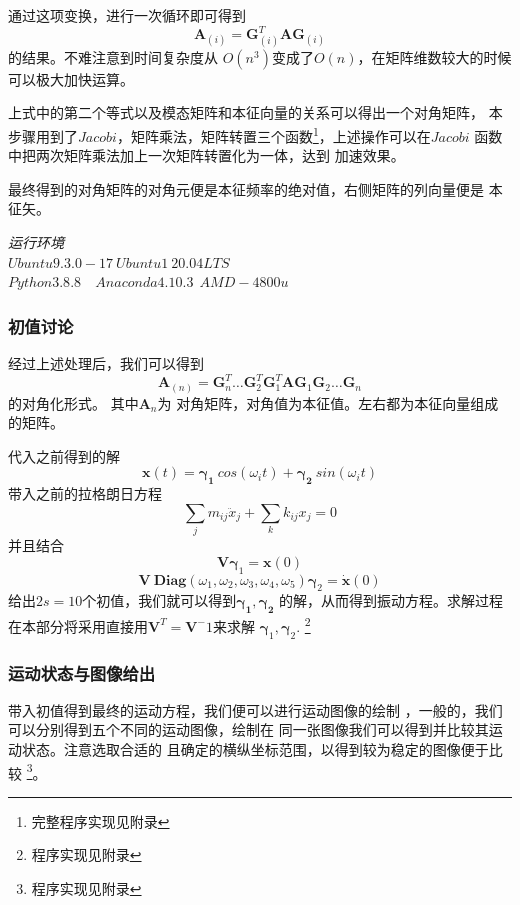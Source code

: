 \documentclass[11pt, a4paper, oneside]{ctexart}
\begin{document}
{{{通过这项变换，进行一次循环即可得到
$$\boldsymbol A_{(i)}=\boldsymbol G_{(i)}^T 
\boldsymbol {A}
\boldsymbol G_{(i)}$$
的结果。不难注意到时间复杂度从
$O(n^3)$变成了$O(n)$，在矩阵维数较大的时候
可以极大加快运算。

上式中的第二个等式以及模态矩阵和本征向量的关系可以得出一个对角矩阵，
本步骤用到了$Jacobi$，矩阵乘法，矩阵转置三个函数\footnote{完整程序实现见附录}，上述操作可以在$Jacobi$
函数中把两次矩阵乘法加上一次矩阵转置化为一体，达到
加速效果。

最终得到的对角矩阵的对角元便是本征频率的绝对值，右侧矩阵的列向量便是
本征矢。


    {    \begin{flushright}
    \scriptsize\emph{运行环境\\$Ubuntu 9.3.0-17\ Ubuntu1~20.04LTS$}\\
    \scriptsize\emph{$Python 3.8.8$\ \ $Anaconda 4.10.3\ \  AMD-4800u$}
        
    \end{flushright}
    }
\subsubsection{初值讨论}

\par 经过上述处理后，我们可以得到$$\boldsymbol {A}_{(n)}=\boldsymbol G_n^T \dots\boldsymbol G_2^T \boldsymbol G_1^T 
\boldsymbol {A}
\boldsymbol G_1\boldsymbol G_2\dots \boldsymbol G_n$$的对角化形式。
其中$\boldsymbol A_n$为
对角矩阵，对角值为本征值。左右都为本征向量组成的矩阵。

\par 代入之前得到的解$$
\bm x(t)=\bm{\gamma_{1}}\ cos(\omega_it)+\bm{\gamma_{2}}\ sin(\omega_it)
$$
带入之前的拉格朗日方程
$$
\sum_jm_{ij}\ddot x_j + \sum_k k_{ij} x_j = 0
$$
并且结合$$
\boldsymbol {V} \boldsymbol\gamma_1 = \boldsymbol x(0)
$$$$
\boldsymbol {V}\  \boldsymbol {Diag}(\omega_1,\omega_2,\omega_3,\omega_4,\omega_5)\boldsymbol\gamma_2 = \boldsymbol{\dot x}(0) 
$$
给出$2s=10$个初值，我们就可以得到$\bm{\gamma_{1}},\bm{\gamma_{2}}$
的解，从而得到振动方程。求解过程在本部分将采用直接用$\boldsymbol V^T = \boldsymbol V^-1$来求解
$\boldsymbol\gamma_1 ,\boldsymbol\gamma_2$.
\footnote{程序实现见附录}


    
\subsubsection{运动状态与图像给出}
{
带入初值得到最终的运动方程，我们便可以进行运动图像的绘制
，一般的，我们可以分别得到五个不同的运动图像，绘制在
同一张图像我们可以得到并比较其运动状态。注意选取合适的
且确定的横纵坐标范围，以得到较为稳定的图像便于比较
\footnote{程序实现见附录}。
}



}}}
\end{document}
